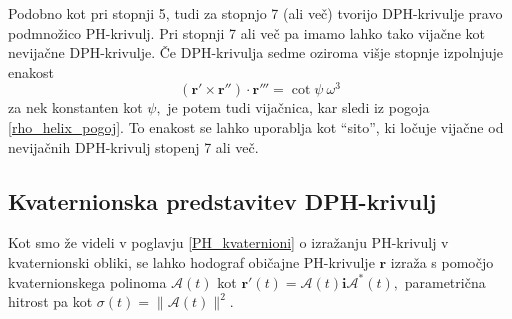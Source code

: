 \documentclass[12pt,a4paper,twoside]{article}
\theoremstyle{definition} %
\theoremstyle{plain} %
\theoremstyle{primerstyle}
\numberwithin{equation}{section}  %
\newcommand{\rV}{\mathbf{r}}
\newcommand{\iV}{\mathbf{i}}
\newcommand{\AQ}{\mathcal{A}}
\begin{document}
Podobno kot pri stopnji 5, tudi za stopnjo 7 (ali več) tvorijo DPH-krivulje pravo podmnožico PH-krivulj. Pri stopnji 7 ali več pa imamo lahko tako vijačne kot nevijačne DPH-krivulje. Če DPH-krivulja sedme oziroma višje stopnje izpolnjuje enakost
\begin{equation}
	\label{mesani_kotangens_omega}
	(\rV'\times\rV'')\cdot\rV'''=\cot\psi\ \omega^3
\end{equation}
za nek konstanten kot $\psi,$ je potem tudi vijačnica, kar sledi iz pogoja \eqref{rho_helix_pogoj}. To enakost se lahko uporablja kot ``sito'', ki ločuje vijačne od nevijačnih DPH-krivulj stopenj 7 ali več.

\subsection{Kvaternionska predstavitev DPH-krivulj}

Kot smo že videli v poglavju \ref{PH_kvaternioni} o izražanju PH-krivulj v kvaternionski obliki, se lahko hodograf običajne PH-krivulje $\rV$ izraža s pomočjo kvaternionskega polinoma $\AQ(t)$ kot $\rV'(t)=\AQ(t)\iV\AQ^*(t),$ parametrična hitrost pa kot $\sigma(t)=\lVert \AQ(t) \rVert^2.$ 
\end{document}
